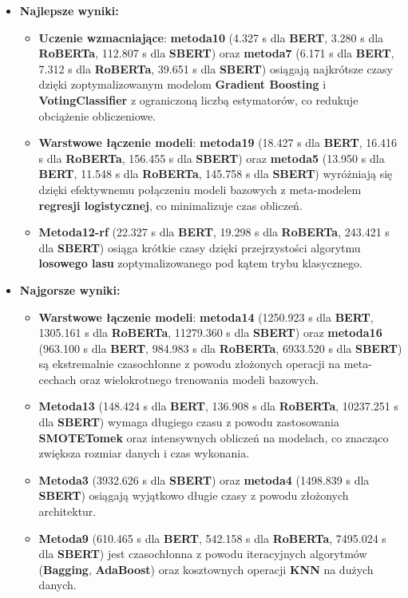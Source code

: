 \begin{itemize}
	\item \textbf{Najlepsze wyniki:}
	      \begin{itemize}
		      \item \textbf{Uczenie wzmacniające}: \textbf{metoda10} (4.327 s dla \textbf{BERT}, 3.280 s dla \textbf{RoBERTa}, 112.807 s dla \textbf{SBERT}) oraz \textbf{metoda7} (6.171 s dla \textbf{BERT}, 7.312 s dla \textbf{RoBERTa}, 39.651 s dla \textbf{SBERT}) osiągają najkrótsze czasy dzięki zoptymalizowanym modelom \textbf{Gradient Boosting} i \textbf{VotingClassifier} z ograniczoną liczbą estymatorów, co redukuje obciążenie obliczeniowe.
		      \item \textbf{Warstwowe łączenie modeli}: \textbf{metoda19} (18.427 s dla \textbf{BERT}, 16.416 s dla \textbf{RoBERTa}, 156.455 s dla \textbf{SBERT}) oraz \textbf{metoda5} (13.950 s dla \textbf{BERT}, 11.548 s dla \textbf{RoBERTa}, 145.758 s dla \textbf{SBERT}) wyróżniają się dzięki efektywnemu połączeniu modeli bazowych z meta-modelem \textbf{regresji logistycznej}, co minimalizuje czas obliczeń.
		      \item \textbf{Metoda12-rf} (22.327 s dla \textbf{BERT}, 19.298 s dla \textbf{RoBERTa}, 243.421 s dla \textbf{SBERT}) osiąga krótkie czasy dzięki przejrzystości algorytmu \textbf{losowego lasu} zoptymalizowanego pod kątem trybu klasycznego.
	      \end{itemize}
	\item \textbf{Najgorsze wyniki:}
	      \begin{itemize}
		      \item \textbf{Warstwowe łączenie modeli}: \textbf{metoda14} (1250.923 s dla \textbf{BERT}, 1305.161 s dla \textbf{RoBERTa}, 11279.360 s dla \textbf{SBERT}) oraz \textbf{metoda16} (963.100 s dla \textbf{BERT}, 984.983 s dla \textbf{RoBERTa}, 6933.520 s dla \textbf{SBERT}) są ekstremalnie czasochłonne z powodu złożonych operacji na meta-cechach oraz wielokrotnego trenowania modeli bazowych.
		      \item \textbf{Metoda13} (148.424 s dla \textbf{BERT}, 136.908 s dla \textbf{RoBERTa}, 10237.251 s dla \textbf{SBERT}) wymaga długiego czasu z powodu zastosowania \textbf{SMOTETomek} oraz intensywnych obliczeń na modelach, co znacząco zwiększa rozmiar danych i czas wykonania.
		      \item \textbf{Metoda3} (3932.626 s dla \textbf{SBERT}) oraz \textbf{metoda4} (1498.839 s dla \textbf{SBERT}) osiągają wyjątkowo długie czasy z powodu złożonych architektur.
		      \item \textbf{Metoda9} (610.465 s dla \textbf{BERT}, 542.158 s dla \textbf{RoBERTa}, 7495.024 s dla \textbf{SBERT}) jest czasochłonna z powodu iteracyjnych algorytmów (\textbf{Bagging}, \textbf{AdaBoost}) oraz kosztownych operacji \textbf{KNN} na dużych danych.
	      \end{itemize}
\end{itemize}

